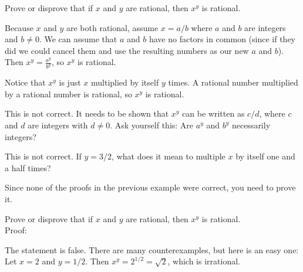 \begin{eval}
Prove or disprove that if $x$ and $y$ are rational, then $x^y$ is rational.
\begin{spfenum}
\item
Because $x$ and $y$ are both rational, assume $x=a/b$ where $a$ and $b$ are integers and $b\neq 0$.
We can assume that $a$ and $b$ have no factors in common (since if they did we could cancel them and use
the resulting numbers as our new $a$ and $b$).
Then $x^y=\frac{a^y}{b^y}$, so $x^y$ is rational.\\
\evallinethree
\item
Notice that $x^y$ is just $x$ multiplied by itself $y$ times.  A rational number multiplied
by a rational number is rational, so $x^y$ is rational.\\
\evallinethree
\end{spfenum}
\begin{answer}
\begin{pfevalenum}
\item
This is not correct.  It needs to be shown that $x^y$ can be written as $c/d$, where $c$ and $d$ are
integers with $d\neq 0$.  Ask yourself this:  Are $a^y$ and $b^y$ necessarily integers?
\item
This is not correct.  If $y=3/2$, what does it mean to multiple $x$ by itself one and a half times?
\end{pfevalenum}
\end{answer}
\end{eval}

Since none of the proofs in the previous example were correct, you need to prove it.

\newpage
\begin{exer}
Prove or disprove that if $x$ and $y$ are rational, then $x^y$ is rational.\\
Proof:
\vspace*{2in}
\begin{answer}
The statement is false.  There are many counterexamples, but here is an easy one:
Let $x=2$ and $y=1/2$.  Then $x^y=2^{1/2}=\sqrt{2}$, which is irrational.
\end{answer}
\end{exer}

